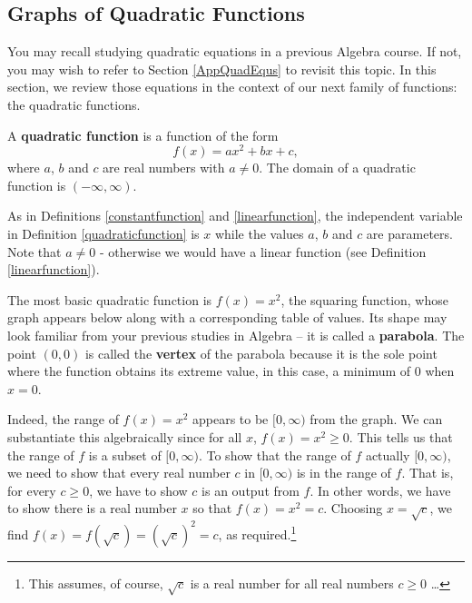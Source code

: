 

\setcounter{footnote}{0}

\label{QuadraticFunctions}

\subsection{Graphs of Quadratic Functions}
\label{GraphsofQuadraticFunctions}


You may recall studying quadratic equations in a previous Algebra course.  If not, you may wish to refer to Section \ref{AppQuadEqus} to revisit this topic. In this section, we review those equations in the context of our next family of functions: the quadratic functions.

\medskip

\colorbox{ResultColor}{\bbm

\begin{defn} \label{quadraticfunction} A \textbf{quadratic function} is a function of the form \[ f(x) = ax^2 + bx + c,\] where $a$, $b$ and $c$ are real numbers with $a \neq 0$.  The domain of a quadratic function is $(-\infty, \infty)$.

\end{defn}

\ebm}

\medskip

As in Definitions \ref{constantfunction} and \ref{linearfunction}, the independent variable in Definition \ref{quadraticfunction} is $x$ while the  values $a$, $b$ and $c$ are parameters. Note that $a \neq 0$ - otherwise we would have a linear function (see Definition  \ref{linearfunction}).

\medskip

The most basic quadratic function is $f(x) = x^2$, the squaring function, whose graph appears below along with a corresponding table of values. Its shape may look familiar from your previous studies in Algebra -- it is called a  \textbf{parabola}. The point $(0,0)$ is called the \textbf{vertex} of the parabola because it is the sole point where the function obtains its extreme value, in this case, a minimum of $0$ when $x = 0$. 

\medskip

Indeed, the range of $f(x) = x^2$ appears to be $[0, \infty)$ from the graph. We can substantiate this algebraically since for all $x$, $f(x) = x^2 \geq 0$.  This tells us that the range of $f$ is a subset of $[0, \infty)$.  To show that the range of $f$ actually  $[0, \infty)$, we need to show that every real number $c$ in $[0, \infty)$ is in the range of $f$.  That is, for every $c \geq 0$, we have to show $c$ is an output from $f$.  In other words, we have to show there is a real number $x$ so that  $f(x) = x^2 = c$.  Choosing $x = \sqrt{c}$, we find $f(x) = f(\sqrt{c}) = (\sqrt{c})^2 = c$, as required.\footnote{This assumes, of course, $\sqrt{c}$ is a real number for all real numbers $c \geq 0$ \ldots} 

